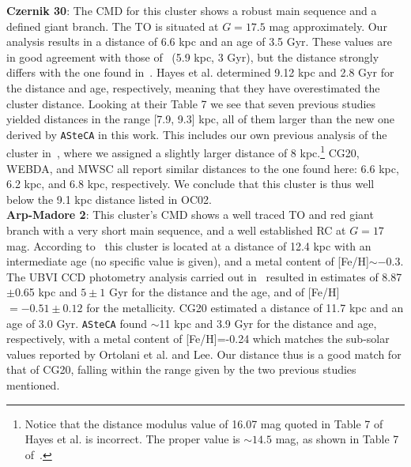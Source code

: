 \documentclass[referee]{aa}
\begin{document}
  \noindent \textbf{Czernik 30}: The CMD for this cluster shows a robust main sequence
  and a defined giant branch. The TO is situated at $G=17.5$ mag approximately.
  Our analysis results in a distance of 6.6 kpc and an age of 3.5 Gyr. These
  values are in good agreement with those of~\cite{Dias_2021} (5.9 kpc, 3 Gyr),
  but the distance strongly differs with the one found in~\cite{Hayes_2015}.
  Hayes et al. determined 9.12 kpc and 2.8 Gyr for the distance and age,
  respectively, meaning that they have overestimated the cluster distance.
  Looking at their Table 7 we see that seven previous studies yielded distances
  in the range [7.9, 9.3] kpc, all of them larger than the new one derived by
  \texttt{ASteCA} in this work. This includes our own previous analysis of the
  cluster in~\cite{Perren_2015}, where we assigned a slightly larger distance of
  8 kpc.\footnote{Notice that the distance modulus value of 16.07 mag quoted in
  Table 7 of Hayes et al. is incorrect. The proper value is $\sim14.5$ mag, as
  shown in Table 7 of~\cite{Perren_2015}.}
  CG20, WEBDA, and MWSC all report similar distances to the one found here:
  6.6 kpc, 6.2 kpc, and 6.8 kpc, respectively. We conclude that this cluster
  is thus well below the 9.1 kpc distance listed in OC02.\\

  \noindent \textbf{Arp-Madore 2}: This cluster's CMD shows a well traced TO and
  red giant branch with a very short main sequence, and a
  well established RC at $G=17$ mag.
  According to~\cite{Ortolani_1995} this cluster is located at a distance of
  12.4 kpc with an intermediate age (no specific value is given), and a metal
  content of [Fe/H]$\sim-0.3$.
  The UBVI CCD photometry analysis carried out in~\cite{Lee_1997} resulted in
  estimates of 8.87$\pm$0.65 kpc and $5\pm1$ Gyr for the distance and the age,
  and of [Fe/H]$=-0.51\pm0.12$ for the metallicity.
  CG20 estimated a distance of 11.7 kpc and an age of 3.0 Gyr.
  \texttt{ASteCA} found $\sim$11 kpc and 3.9 Gyr for the distance and
  age, respectively, with a metal content of [Fe/H]=-0.24 which matches the
  sub-solar values reported by Ortolani et al. and Lee.
  Our distance thus is a good match for that of CG20, falling within the range
  given by the two previous studies mentioned.\\
\end{document}
